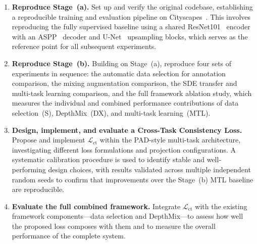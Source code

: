 \begin{enumerate}

\item \textbf{Reproduce Stage~(a).} Set up and verify the original codebase,
establishing a reproducible training and evaluation pipeline on
Cityscapes~\cite{cordts2016cityscapes}. This involves reproducing the fully
supervised baseline using a shared ResNet101~\cite{he2016deep} encoder
with an ASPP~\cite{chen2018encoder} decoder and
U-Net~\cite{ronneberger2015u} upsampling blocks, which serves as the
reference point for all subsequent experiments.

\item \textbf{Reproduce Stage~(b).} Building on Stage~(a), reproduce four
sets of experiments in sequence: the automatic data selection for annotation
comparison, the mixing augmentation comparison, the SDE transfer and
multi-task learning comparison, and the full framework ablation study, which
measures the individual and combined performance contributions of data
selection~(S), DepthMix~(DX), and multi-task learning~(MTL).

\item \textbf{Design, implement, and evaluate a Cross-Task Consistency
Loss.} Propose and implement $\mathcal{L}_\text{ct}$ within the PAD-style
multi-task architecture, investigating different loss formulations and
projection configurations. A systematic calibration procedure is used to
identify stable and well-performing design choices, with results validated
across multiple independent random seeds to confirm that improvements over
the Stage~(b) MTL baseline are reproducible.

\item \textbf{Evaluate the full combined framework.} Integrate
$\mathcal{L}_\text{ct}$ with the existing framework components---data
selection and DepthMix---to assess how well the proposed loss composes with
them and to measure the overall performance of the complete system.

\end{enumerate}